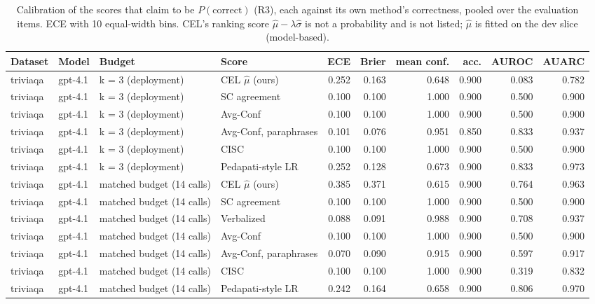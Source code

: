 \begin{table}[t]
\centering
\small
\begin{tabular}{llllrrrrrr}
\toprule
Dataset & Model & Budget & Score & ECE & Brier & mean conf. & acc. & AUROC & AUARC \\
\midrule
triviaqa & gpt-4.1 & k = 3 (deployment) & CEL $\hat\mu$ (ours) & 0.252 & 0.163 & 0.648 & 0.900 & 0.083 & 0.782 \\
triviaqa & gpt-4.1 & k = 3 (deployment) & SC agreement & 0.100 & 0.100 & 1.000 & 0.900 & 0.500 & 0.900 \\
triviaqa & gpt-4.1 & k = 3 (deployment) & Avg-Conf & 0.100 & 0.100 & 1.000 & 0.900 & 0.500 & 0.900 \\
triviaqa & gpt-4.1 & k = 3 (deployment) & Avg-Conf, paraphrases & 0.101 & 0.076 & 0.951 & 0.850 & 0.833 & 0.937 \\
triviaqa & gpt-4.1 & k = 3 (deployment) & CISC & 0.100 & 0.100 & 1.000 & 0.900 & 0.500 & 0.900 \\
triviaqa & gpt-4.1 & k = 3 (deployment) & Pedapati-style LR & 0.252 & 0.128 & 0.673 & 0.900 & 0.833 & 0.973 \\
triviaqa & gpt-4.1 & matched budget (14 calls) & CEL $\hat\mu$ (ours) & 0.385 & 0.371 & 0.615 & 0.900 & 0.764 & 0.963 \\
triviaqa & gpt-4.1 & matched budget (14 calls) & SC agreement & 0.100 & 0.100 & 1.000 & 0.900 & 0.500 & 0.900 \\
triviaqa & gpt-4.1 & matched budget (14 calls) & Verbalized & 0.088 & 0.091 & 0.988 & 0.900 & 0.708 & 0.937 \\
triviaqa & gpt-4.1 & matched budget (14 calls) & Avg-Conf & 0.100 & 0.100 & 1.000 & 0.900 & 0.500 & 0.900 \\
triviaqa & gpt-4.1 & matched budget (14 calls) & Avg-Conf, paraphrases & 0.070 & 0.090 & 0.915 & 0.900 & 0.597 & 0.917 \\
triviaqa & gpt-4.1 & matched budget (14 calls) & CISC & 0.100 & 0.100 & 1.000 & 0.900 & 0.319 & 0.832 \\
triviaqa & gpt-4.1 & matched budget (14 calls) & Pedapati-style LR & 0.242 & 0.164 & 0.658 & 0.900 & 0.806 & 0.970 \\
\bottomrule
\end{tabular}
\caption{Calibration of the scores that claim to be $P(\text{correct})$ (R3), each against its own method's correctness, pooled over the evaluation items. ECE with 10 equal-width bins. CEL's ranking score $\hat\mu - \lambda\hat\sigma$ is not a probability and is not listed; $\hat\mu$ is fitted on the dev slice (model-based).}
\label{tab:calibration}
\end{table}
